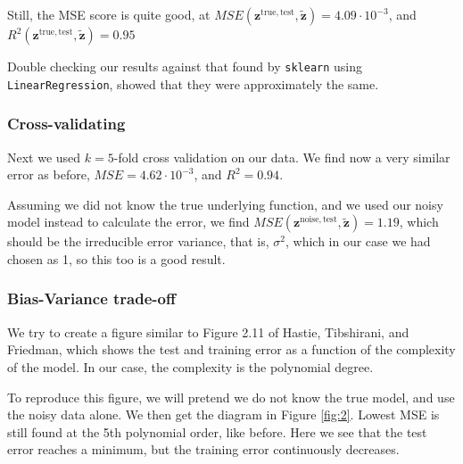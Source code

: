 \documentclass[a4paper,10pt,english]{article}
\def\code#1{\texttt{#1}} %
\begin{document}
Still, the MSE score is quite good, at $MSE(\bm{z}^\mathrm{true,test}, \bm{\tilde z})=4.09\cdot 10 ^{-3}$, and $R^2(\bm{z}^\mathrm{true,test}, \bm{\tilde z})=0.95$

Double checking our results against that found by \code{sklearn} using \code{LinearRegression}, showed that they were approximately the same.

\subsubsection{Cross-validating}
Next we used $k=5$-fold cross validation on our data.
We find now a very similar error as before, $MSE = 4.62\cdot 10^{-3}$, and $R^2= 0.94$.

Assuming we did not know the true underlying function, and we used our noisy model instead to calculate the error, we find
$MSE(\bm{z}^\mathrm{noise,test}, \bm{\tilde z}) = 1.19$,
which should be the irreducible error variance, that is, $\sigma^2$, which in our case we had chosen as 1, so this too is a good result.


\subsubsection{ Bias-Variance trade-off}
We try to create a figure similar to Figure 2.11 of Hastie, Tibshirani, and Friedman, which shows the test and training error as a function of the complexity of the model. In our case, the complexity is the polynomial degree.

To reproduce this figure, we will pretend we do not know the true model, and use the noisy data alone. We then get the diagram in Figure \ref{fig:2}. Lowest MSE is still found at the 5th polynomial order, like before. Here we see that the test error reaches a minimum, but the training error continuously decreases.
 
\end{document}
